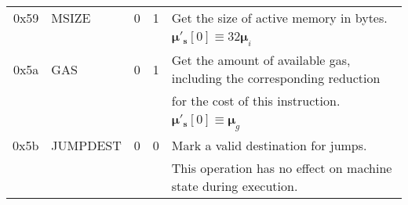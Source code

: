 \documentclass[9pt,oneside]{amsart}
\begin{document}
\begin{tabular*}{\columnwidth}[h]{rlrrl}
\midrule
0x59 & {\small MSIZE} & 0 & 1 & Get the size of active memory in bytes. \\
&&&& $\boldsymbol{\mu}'_{\mathbf{s}}[0] \equiv 32\boldsymbol{\mu}_{i}$ \\
\midrule
0x5a & {\small GAS} & 0 & 1 & Get the amount of available gas, including the corresponding reduction \\
&&&& for the cost of this instruction. \\
&&&& $\boldsymbol{\mu}'_{\mathbf{s}}[0] \equiv \boldsymbol{\mu}_{g}$ \\
\midrule
0x5b & {\small JUMPDEST} & 0 & 0 & Mark a valid destination for jumps. \\
&&&& This operation has no effect on machine state during execution. \\
\bottomrule
\end{tabular*}
\end{document}
